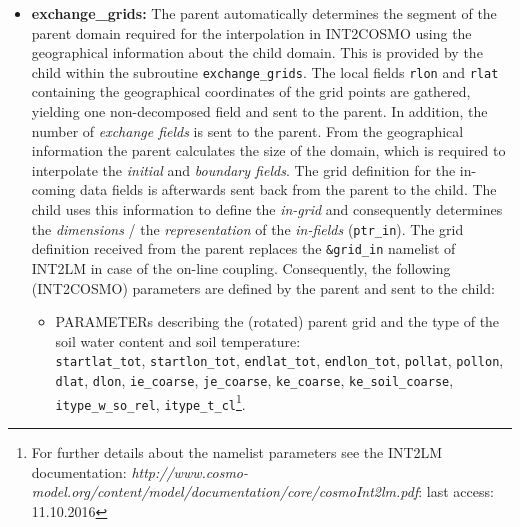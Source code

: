 \documentclass[11pt,twoside]{article}
\begin{document}
\begin{itemize}
\item {\bf exchange\_grids:} \label{SR:exchange_grids}
The parent automatically determines the segment of the
parent domain required for the interpolation in INT2COSMO using the
geographical  
information about the child domain. This is provided by the child
within the subroutine  \verb|exchange_grids|. The local fields \verb|rlon|
and \verb|rlat| containing the geographical coordinates of the grid points
are gathered, yielding one non-decomposed field and sent to the parent. 
In addition, the number of {\it exchange fields} is sent to the parent. 
From the geographical information the parent
calculates the size of the domain, which is required to interpolate the
{\it initial} and {\it boundary fields}. The grid definition for the 
 in-coming data fields 
is afterwards sent back from the parent to the child. The child uses this
information to define the {\it in-grid} and consequently determines the
{\it dimensions} / the {\it representation} of the {\it in-fields}
(\verb|ptr_in|).  
The grid definition received from the parent replaces the \verb|&grid_in| 
namelist of INT2LM in case of the
on-line coupling. Consequently, the following (INT2COSMO) parameters 
are defined by the parent and sent to the child:
\begin{itemize}%
\item {\footnotesize PARAMETERs} describing the (rotated) parent
grid and the type of the soil water content and soil temperature:\\ 
\verb|startlat_tot|, \verb|startlon_tot|, \verb|endlat_tot|, \verb|endlon_tot|,
 \verb|pollat|, \verb|pollon|, \verb|dlat|, \verb|dlon|, \verb|ie_coarse|,
 \verb|je_coarse|, \verb|ke_coarse|, \verb|ke_soil_coarse|, 
\verb|itype_w_so_rel|, \verb|itype_t_cl|\footnote{For further
 details 
 about the namelist parameters see the INT2LM documentation: {\it 
http://www.cosmo-model.org/content/model/documentation/core/cosmoInt2lm.pdf}:
 last access: 11.10.2016}. 



\end{itemize}
\end{itemize}
\end{document}
